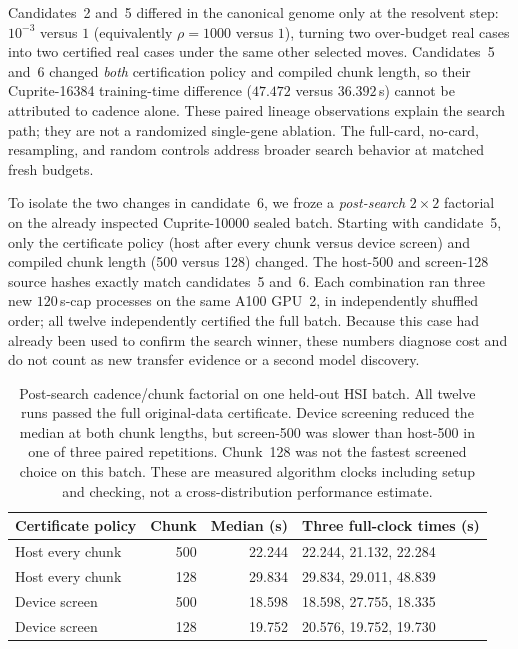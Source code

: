 Candidates~2 and~5 differed in the canonical genome only at the resolvent
step: $10^{-3}$ versus $1$ (equivalently $\rho=1000$ versus $1$), turning two
over-budget real cases into two certified real cases under the same other
selected moves. Candidates~5 and~6 changed \emph{both} certification policy
and compiled chunk length, so their Cuprite-16384 training-time difference
($47.472$ versus $36.392$\,s) cannot be attributed to cadence alone. These
paired lineage observations explain the search path; they are not a randomized
single-gene ablation. The full-card, no-card, resampling, and random controls
address broader search behavior at matched fresh budgets.

To isolate the two changes in candidate~6, we froze a \emph{post-search}
$2\times2$ factorial on the already inspected Cuprite-10000 sealed batch.
Starting with candidate~5, only the certificate policy (host after every
chunk versus device screen) and compiled chunk length (500 versus 128) changed.
The host-500 and screen-128 source hashes exactly match candidates~5 and~6.
Each combination ran three new $120$\,s-cap processes on the same A100 GPU~2,
in independently shuffled order; all twelve independently certified the full
batch. Because this case had already been used to confirm the search winner,
these numbers diagnose cost and do not count as new transfer evidence or a
second model discovery.

\begin{table}[t]
\centering\small
\begin{tabular}{lrrl}
\toprule
Certificate policy & Chunk & Median (s) & Three full-clock times (s) \\
\midrule
Host every chunk & 500 & 22.244 & 22.244, 21.132, 22.284 \\
Host every chunk & 128 & 29.834 & 29.834, 29.011, 48.839 \\
Device screen & 500 & 18.598 & 18.598, 27.755, 18.335 \\
Device screen & 128 & 19.752 & 20.576, 19.752, 19.730 \\
\bottomrule
\end{tabular}
\caption{Post-search cadence/chunk factorial on one held-out HSI batch.
All twelve runs passed the full original-data certificate. Device screening
reduced the median at both chunk lengths, but screen-500 was slower than
host-500 in one of three paired repetitions. Chunk~128 was not the fastest
screened choice on this batch. These are measured algorithm clocks including
setup and checking, not a cross-distribution performance estimate.}
\label{tab:llm-loop-cadence-factorial}
\end{table}

